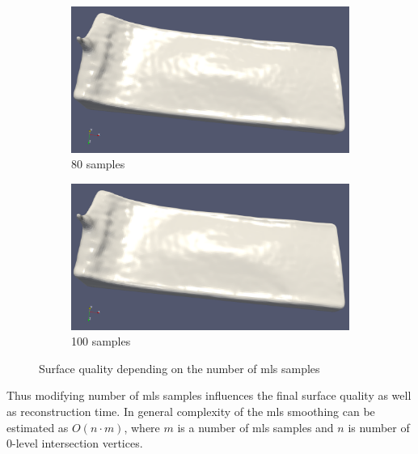 \begin{figure}[H]
\begin{center}
\begin{subfigure}[b]{0.49\textwidth}
			\includegraphics[width=\textwidth]{figures/MlsSamples80png.png}
			\caption{80 samples}
		\end{subfigure}
		\begin{subfigure}[b]{0.49\textwidth}
			\includegraphics[width=\textwidth]{figures/MlsSamples100.png}
			\caption{100 samples}
		\end{subfigure}
	\end{center}
	\caption{Surface quality depending on the number of mls samples} \label{fig:mls_samples_example_surfaces}
\end{figure}
Thus modifying number of mls samples influences the final surface quality as well as reconstruction time. In general complexity of the mls smoothing can be estimated as $O(n \cdot m)$, where $m$ is a number of mls samples and $n$ is number of 0-level intersection vertices.
